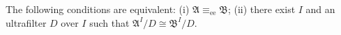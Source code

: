 The following conditions are equivalent:
(i) $\mathfrak{A} \equiv_{\text{ee}} \mathfrak{B}$;
(ii) there exist $I$ and an ultrafilter $D$ over $I$ such that $\mathfrak{A}^I/D \cong \mathfrak{B}^I/D$.
